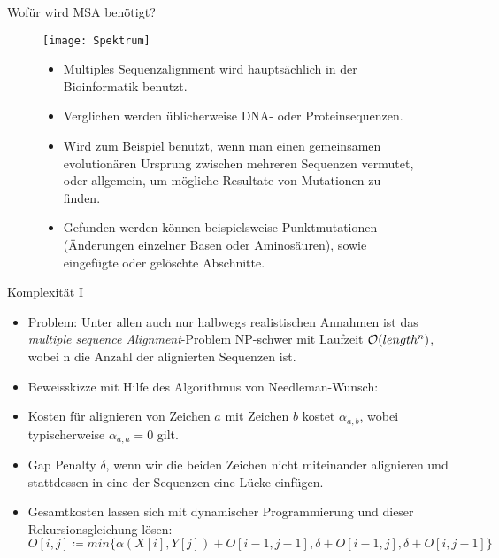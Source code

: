 \documentclass[wide,xcolor={x11names},hyperref={colorlinks=false},pantone312]{beamer}
\begin{document}
\begin{frame}[t]{Wofür wird MSA benötigt?}
	\begin{figure}[htbp]
		\begin{minipage}[t]{5cm}
			\vspace{0pt}
			\centering
			\texttt{[image: Spektrum]}
		\end{minipage}
		\hfill
		\begin{minipage}[t]{7cm}
			\small
			\begin{itemize}
				\item Multiples Sequenzalignment wird hauptsächlich in der Bioinformatik benutzt.
				\item Verglichen werden üblicherweise DNA- oder Proteinsequenzen.
				\item Wird zum Beispiel benutzt, wenn man einen gemeinsamen evolutionären Ursprung zwischen mehreren Sequenzen vermutet, oder allgemein, um mögliche Resultate von Mutationen zu finden.
				\item Gefunden werden können beispielsweise Punktmutationen (Änderungen einzelner Basen oder Aminosäuren), sowie eingefügte oder gelöschte Abschnitte.
			\end{itemize}
			\normalsize
		\end{minipage}
	\end{figure}
\end{frame}

\begin{frame}[t]{Komplexität I}
	\begin{itemize}
		\item Problem: Unter allen auch nur halbwegs realistischen Annahmen ist das \textit{multiple sequence Alignment}-Problem NP-schwer mit Laufzeit $\mathcal{O}(length^ n)$, wobei n die Anzahl der alignierten Sequenzen ist.
		\item Beweisskizze mit Hilfe des Algorithmus von Needleman-Wunsch:
		\item Kosten für alignieren von Zeichen $a$ mit Zeichen $b$ kostet $\alpha_{a,b}$, wobei typischerweise $\alpha_{a,a} = 0$ gilt.
		\item Gap Penalty $\delta$, wenn wir die beiden Zeichen nicht miteinander alignieren und stattdessen in eine der Sequenzen eine Lücke einfügen.
		\item Gesamtkosten lassen sich mit dynamischer Programmierung und dieser Rekursionsgleichung lösen: \\
			$O[i,j] \coloneqq min\{\alpha(X[i], Y[j]) + O[i-1, j-1], \delta + O[i-1, j], \delta + O[i, j-1]\}$
	\end{itemize}
\end{frame}
\end{document}
